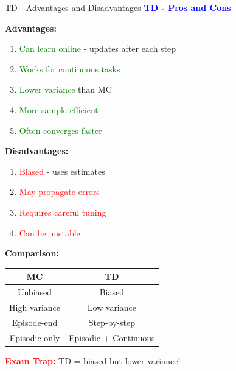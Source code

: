 \documentclass[8pt]{beamer}
\begin{document}
	\begin{frame}{TD - Advantages and Disadvantages}
		\fontsize{6.5}{7.5}\selectfont
		\textcolor{blue}{\textbf{TD - Pros and Cons}}
		
		\textbf{Advantages:}
		\begin{enumerate}
			\item \textcolor{green}{Can learn online} - updates after each step
			\item \textcolor{green}{Works for continuous tasks}
			\item \textcolor{green}{Lower variance} than MC
			\item \textcolor{green}{More sample efficient}
			\item \textcolor{green}{Often converges faster}
		\end{enumerate}
		
		\textbf{Disadvantages:}
		\begin{enumerate}
			\item \textcolor{red}{Biased} - uses estimates
			\item \textcolor{red}{May propagate errors}
			\item \textcolor{red}{Requires careful tuning}
			\item \textcolor{red}{Can be unstable}
		\end{enumerate}
		
		\textbf{Comparison:}
		\begin{tabular}{|c|c|}
			\hline
			MC & TD \\
			\hline
			Unbiased & Biased \\
			\hline
			High variance & Low variance \\
			\hline
			Episode-end & Step-by-step \\
			\hline
			Episodic only & Episodic + Continuous \\
			\hline
		\end{tabular}
		
		\textcolor{red}{\textbf{Exam Trap:}} TD = biased but lower variance!
	\end{frame}
	
\end{document}
